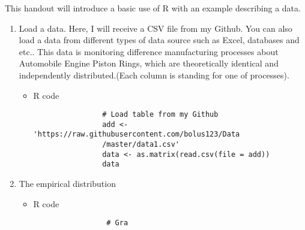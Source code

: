 This handout will introduce a basic use of R with an example describing a data.
\begin{enumerate}
	\item Load a data. Here, I will receive a CSV file from my Github. You can also load a data from different types of data source such as Excel, databases and etc.. This data is monitoring difference manufacturing processes about Automobile Engine Piston Rings, which are theoretically identical and independently distributed.(Each column is standing for one of processes). 
		\begin{itemize}
			\item R code
				\begin{verbatim}
				# Load table from my Github
				add <- 'https://raw.githubusercontent.com/bolus123/Data
				/master/data1.csv'
				data <- as.matrix(read.csv(file = add))
				data
				\end{verbatim}
		\end{itemize}		
	\item The empirical distribution
		\begin{itemize}
			\item R code
				\begin{verbatim}
				 # Gra
				\end{verbatim}
		\end{itemize}
\end{enumerate}